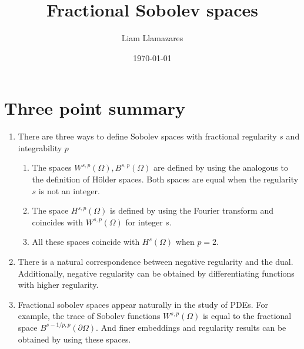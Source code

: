 \documentclass[
    a4paper,
    DIV=14,
    abstract=true,
    numbers=noenddot
]
{scrartcl}
\theoremstyle{definition}
\begin{document}
\title{Fractional Sobolev spaces}
\author{Liam Llamazares}
\date{\today}
\maketitle
\section{Three point summary}
\begin{enumerate}
  \item There are three ways to define Sobolev spaces with fractional regularity $s$ and integrability $p$
        \begin{enumerate}
          \item The spaces $W^{s,p}(\Omega ), B^{s,p}(\Omega )$  are defined by using the analogous to the definition of H\"older spaces. Both spaces are equal when the regularity $s$ is not an integer.

          \item  The space $H^{s,p}(\Omega )$ is defined by using the Fourier transform and coincides with $W^{s,p}(\Omega )$ for integer $s$.
          \item All these spaces coincide with $H^s(\Omega )$  when $p=2$.
        \end{enumerate}
  \item There is a natural correspondence between negative regularity and the dual. Additionally, negative regularity can be obtained by differentiating functions with higher regularity.
  \item Fractional sobolev spaces appear naturally in the study of PDEs. For example, the trace of Sobolev functions $W^{s,p}(\Omega)$ is equal to the fractional space $B^{s-1/p,p}(\partial \Omega)$. And finer embeddings and regularity results can be obtained by using these spaces.
\end{enumerate}
\end{document}
